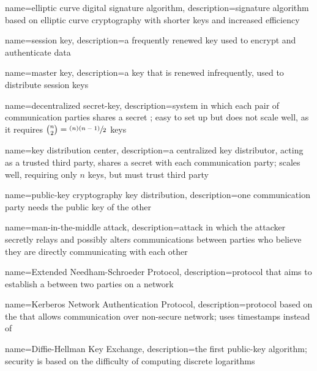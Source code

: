 {
    name={elliptic curve digital signature algorithm},
    description={signature algorithm based on elliptic curve cryptography with shorter keys and increased efficiency}
}

{
    name={session key},
    description={a frequently renewed key used to encrypt and authenticate data}
}

{
    name={master key},
    description={a key that is renewed infrequently, used to distribute \glspl{session key}}
}

{
    name={decentralized secret-key},
    description={system in which each pair of communication parties shares a secret ; easy to set up but does not scale well, as it requires $\binom{n}{2}=\sfrac{(n)(n-1)}{2}$ keys}
}

{
    name={key distribution center},
    description={a centralized key distributor, acting as a trusted third party, shares a secret  with each communication party; scales well, requiring only $n$ keys, but must trust third party}
}

{
    name={public-key cryptography key distribution},
    description={one communication party needs the public key of the other}
}

{
    name={man-in-the-middle attack},
    description={attack in which the attacker secretly relays and possibly alters communications between parties who believe they are directly communicating with each other}
}

{
    name={Extended Needham-Schroeder Protocol},
    description={protocol that aims to establish a  between two parties on a network}
}

{
    name={Kerberos Network Authentication Protocol},
    description={protocol based on the  that allows communication over non-secure network; uses timestamps instead of }
}

{
    name={Diffie-Hellman Key Exchange},
    description={the first public-key algorithm; security is based on the difficulty of computing discrete logarithms}
}

